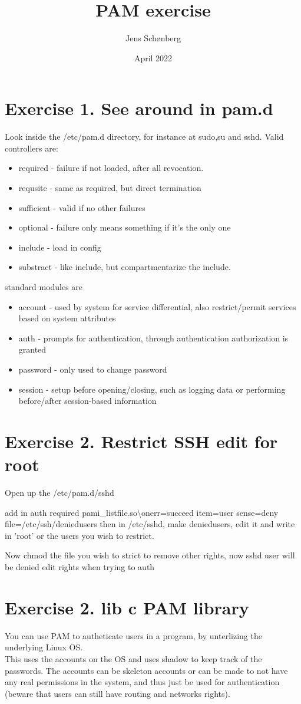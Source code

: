 \documentclass[12pt, letterpaper, twoside]{article}
\title{PAM exercise}
\author{Jens Schønberg}
\date{April 2022}
\begin{document}
\begin{titlepage}
\maketitle
\end{titlepage}

\section{Exercise 1. See around in pam.d}
Look inside the /etc/pam.d directory, for instance at sudo,su and sshd.
Valid controllers are:
\begin{itemize}
	\item required - failure if not loaded, after all revocation.
	\item requsite - same as required, but direct termination
	\item sufficient - valid if no other failures
	\item optional - failure only means something if it's the only one
	\item include - load in config
	\item substract - like include, but compartmentarize the include.
\end{itemize}
standard modules are
\begin{itemize}
	\item account - used by system for service differential, also restrict/permit services based on system attributes
	\item auth - prompts for authentication, through authentication authorization is granted
	\item password - only used to change password
	\item session - setup before opening/closing, such as logging data or performing before/after session-based information
\end{itemize}

\section{Exercise 2. Restrict SSH edit for root}
Open up the /etc/pam.d/sshd

add in
auth required pami\_listfile.so\textbackslash onerr=succeed item=user sense=deny file=/etc/ssh/deniedusers 
then in /etc/sshd, make deniedusers, edit it and write in 'root' or the users you wish to restrict.

Now chmod the file you wish to strict to remove other rights, now sshd user will be denied edit rights when trying to auth

\section{Exercise 2. lib c PAM library}
You can use PAM to autheticate users in a program, by unterlizing the underlying Linux OS. \\
This uses the accounts on the OS and uses shadow to keep track of the passwords.
The accounts can be skeleton accounts or can be made to not have any real permissions in the system, and thus just be used for authentication (beware that users can still have routing and networks rights).
\end{document}
